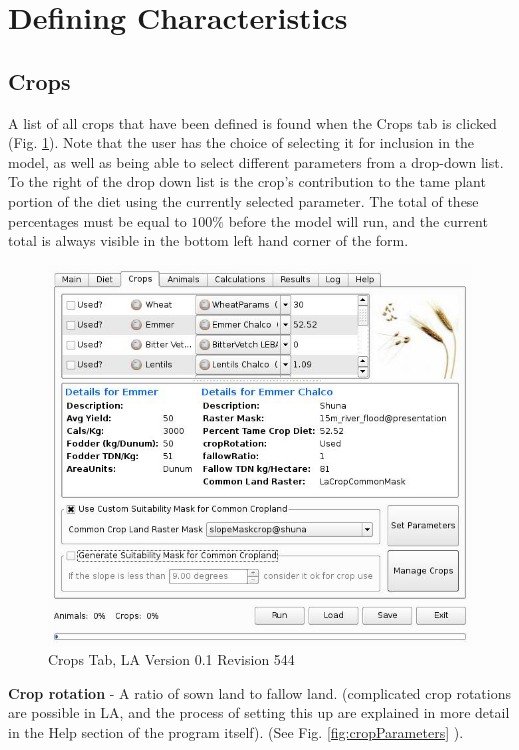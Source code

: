 \section{Defining Characteristics}
 \subsection{Crops}
    A list of all crops that have been defined is found when the Crops tab is
    clicked (Fig. \ref{fig:crop}).  Note that the user has the choice of
    selecting it for inclusion in the model, as well as being able to select
    different parameters from a drop-down list.  To the right of the drop down
    list is the crop's contribution to the tame plant portion of the diet using
    the currently selected parameter.  The total of these percentages must be
    equal to $100\%$ before the model will run, and the current total is always
    visible in the bottom left hand corner of the form.

    \begin{figure}[htbp]
        \includegraphics[scale=.366]{./images/LanduseAnalystCrops546.jpg}
       \caption{\label{fig:crop}Crops Tab, LA Version 0.1 Revision 544}
    \end{figure}

  \textbf{Crop rotation} - A ratio of sown land to fallow land. (complicated crop
  rotations are possible in LA, and the process of setting this up are
  explained in more detail in the Help section of the program itself). (See Fig.
  \ref{fig:cropParameters} ).

